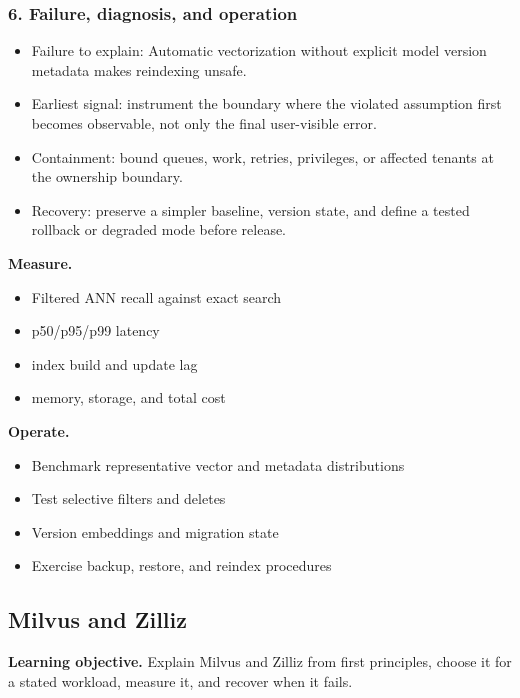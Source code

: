 \subsubsection*{6. Failure, diagnosis, and operation}
\begin{itemize}
\item Failure to explain: Automatic vectorization without explicit model version metadata makes reindexing unsafe.
\item Earliest signal: instrument the boundary where the violated assumption first becomes observable, not only the final user-visible error.
\item Containment: bound queues, work, retries, privileges, or affected tenants at the ownership boundary.
\item Recovery: preserve a simpler baseline, version state, and define a tested rollback or degraded mode before release.
\end{itemize}
\textbf{Measure.}\begin{itemize}
\item Filtered ANN recall against exact search
\item p50/p95/p99 latency
\item index build and update lag
\item memory, storage, and total cost
\end{itemize}
\textbf{Operate.}\begin{itemize}
\item Benchmark representative vector and metadata distributions
\item Test selective filters and deletes
\item Version embeddings and migration state
\item Exercise backup, restore, and reindex procedures
\end{itemize}
\subsection{Milvus and Zilliz}
\textbf{Learning objective.} Explain Milvus and Zilliz from first principles, choose it for a stated workload, measure it, and recover when it fails.
